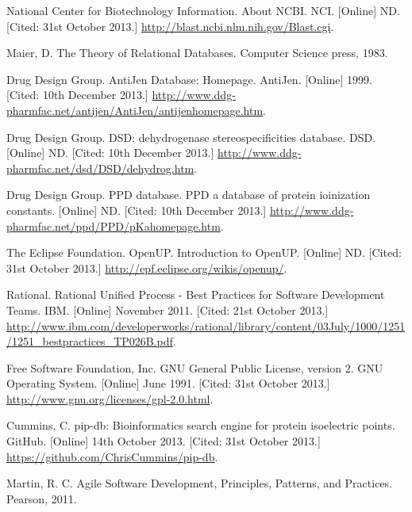 \begin{thebibliography}{9}

 National Center for Biotechnology Information. About
  NCBI. NCI. [Online] ND. [Cited: 31st October 2013.]
  \url{http://blast.ncbi.nlm.nih.gov/Blast.cgi}.

 Maier, D. The Theory of Relational Databases. Computer
  Science press, 1983.

 Drug Design Group. AntiJen Database:
  Homepage. AntiJen. [Online] 1999. [Cited: 10th December 2013.]
  \url{http://www.ddg-pharmfac.net/antijen/AntiJen/antijenhomepage.htm}.

 Drug Design Group. DSD: dehydrogenase stereospecificities
  database. DSD. [Online] ND. [Cited: 10th December 2013.]
  \url{http://www.ddg-pharmfac.net/dsd/DSD/dehydrog.htm}.

 Drug Design Group. PPD database. PPD a database of protein
  ioinization constants. [Online] ND. [Cited: 10th December 2013.]
  \url{http://www.ddg-pharmfac.net/ppd/PPD/pKahomepage.htm}.

 The Eclipse Foundation. OpenUP. Introduction to
  OpenUP. [Online] ND. [Cited: 31st October 2013.]
  \url{http://epf.eclipse.org/wikis/openup/}.

 Rational. Rational Unified Process - Best Practices for
  Software Development Teams. IBM. [Online] November 2011. [Cited: 21st October
    2013.]
  \url{http://www.ibm.com/developerworks/rational/library/content/03July/1000/1251/1251_bestpractices_TP026B.pdf}.

 Free Software Foundation, Inc. GNU General Public License,
  version 2. GNU Operating System. [Online] June 1991. [Cited: 31st October
    2013.] \url{http://www.gnu.org/licenses/gpl-2.0.html}.

 Cummins, C. pip-db: Bioinformatics search engine for
  protein isoelectric points. GitHub. [Online] 14th October 2013. [Cited: 31st
    October 2013.]  \url{https://github.com/ChrisCummins/pip-db}.

 Martin, R. C. Agile Software Development, Principles,
  Patterns, and Practices. Pearson, 2011.

\end{thebibliography}
